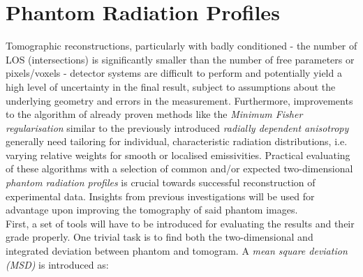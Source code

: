     \section{Phantom Radiation Profiles}\label{sec:phantoms}%
%
        Tomographic reconstructions, particularly with badly conditioned - the number of LOS (intersections) is significantly smaller than the number of free parameters or pixels/voxels - detector systems are difficult to perform and potentially yield a high level of uncertainty in the final result, subject to assumptions about the underlying geometry and errors in the measurement. Furthermore, improvements to the algorithm of already proven methods like the \textit{Minimum Fisher regularisation} similar to the previously introduced \textit{radially dependent anisotropy} generally need tailoring for individual, characteristic radiation distributions, i.e. varying relative weights for smooth or localised emissivities. Practical evaluating of these algorithms with a selection of common and/or expected two-dimensional \textit{phantom radiation profiles} is crucial towards successful reconstruction of experimental data. Insights from previous investigations will be used for advantage upon improving the tomography of said phantom images.\\%
        First, a set of tools will have to be introduced for evaluating the results and their grade properly. One trivial task is to find both the two-dimensional and integrated deviation between phantom and tomogram. A \textit{mean square deviation (MSD)} is introduced as:%

